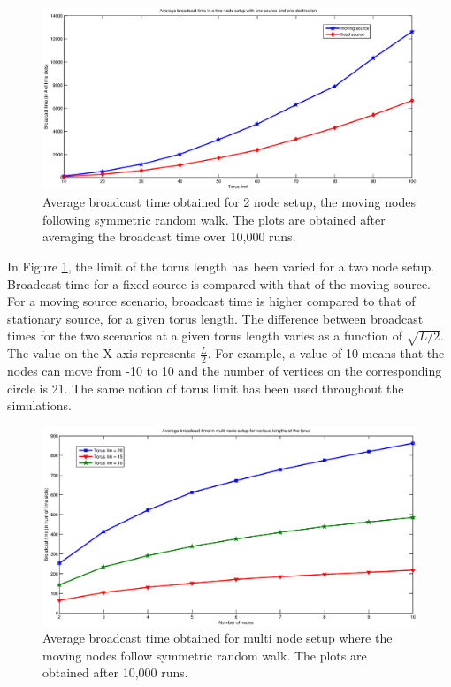 \documentclass[a4paper,10pt,english]{article}
\begin{document}
\begin{figure}[!ht]
	\begin{center}
		\includegraphics[scale = 0.40]{fixed_move_2nodes.eps}
		\caption{Average broadcast time obtained for 2 node setup, the moving nodes following symmetric random walk. The plots are obtained after averaging the broadcast time over 10,000 runs.}
		\label{2node}
	\end{center}
\end{figure}
In Figure \ref{2node}, the limit of the torus length has been varied for a two node setup. Broadcast time for a fixed source is compared with that of the moving source. For a moving source scenario, broadcast time is higher compared to that of stationary source, for a given torus length. The difference between broadcast times for the two scenarios at a given torus length varies as a function of $\sqrt{L/2}$. The value on the X-axis represents $\frac{L}{2}$. For example, a value of 10 means that the nodes can move from -10 to 10 and the number of vertices on the corresponding circle is 21. The same notion of torus limit has been used throughout the simulations.

\begin{figure}[!ht]
\centering
		\includegraphics[scale = 0.5]{multi_node_torus.eps}
		\caption{Average broadcast time obtained for multi node setup where the moving nodes follow symmetric random walk. The plots are obtained after 10,000 runs.}
		\label{multinode_torus}
\end{figure}
\end{document}
